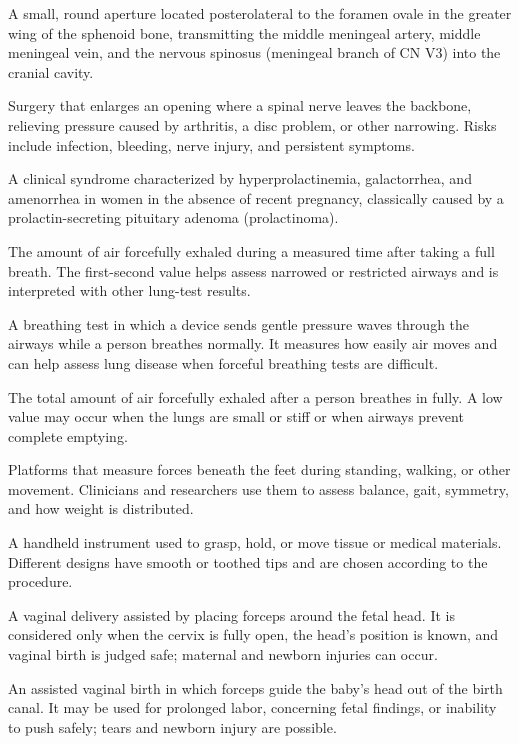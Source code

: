  A small, round aperture located posterolateral to the foramen ovale in the greater wing of the sphenoid bone, transmitting the middle meningeal artery, middle meningeal vein, and the nervous spinosus (meningeal branch of CN V3) into the cranial cavity.

 Surgery that enlarges an opening where a spinal nerve leaves the backbone, relieving pressure caused by arthritis, a disc problem, or other narrowing. Risks include infection, bleeding, nerve injury, and persistent symptoms.

 A clinical syndrome characterized by hyperprolactinemia, galactorrhea, and amenorrhea in women in the absence of recent pregnancy, classically caused by a prolactin-secreting pituitary adenoma (prolactinoma).

 The amount of air forcefully exhaled during a measured time after taking a full breath. The first-second value helps assess narrowed or restricted airways and is interpreted with other lung-test results.

 A breathing test in which a device sends gentle pressure waves through the airways while a person breathes normally. It measures how easily air moves and can help assess lung disease when forceful breathing tests are difficult.

 The total amount of air forcefully exhaled after a person breathes in fully. A low value may occur when the lungs are small or stiff or when airways prevent complete emptying.

 Platforms that measure forces beneath the feet during standing, walking, or other movement. Clinicians and researchers use them to assess balance, gait, symmetry, and how weight is distributed.

 A handheld instrument used to grasp, hold, or move tissue or medical materials. Different designs have smooth or toothed tips and are chosen according to the procedure.

 A vaginal delivery assisted by placing forceps around the fetal head. It is considered only when the cervix is fully open, the head’s position is known, and vaginal birth is judged safe; maternal and newborn injuries can occur.

 An assisted vaginal birth in which forceps guide the baby’s head out of the birth canal. It may be used for prolonged labor, concerning fetal findings, or inability to push safely; tears and newborn injury are possible.

